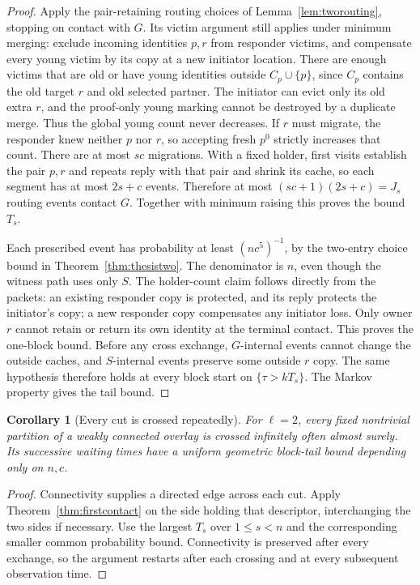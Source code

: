 \documentclass[11pt]{article}
\newtheorem{corollary}[theorem]{Corollary}
\begin{document}
\begin{proof}
Apply the pair-retaining routing choices of
Lemma~\ref{lem:tworouting}, stopping on contact with $G$.
Its victim argument still applies under minimum merging:
exclude incoming identities $p,r$ from responder victims,
and compensate every young victim by its copy at a new
initiator location. There are enough victims that are old
or have young identities outside $C_p\cup\{p\}$, since
$C_p$ contains the old target $r$ and old selected partner.
The initiator can evict only its old extra $r$, and the
proof-only young marking cannot be destroyed by a duplicate
merge. Thus the global young count never decreases.
If $r$ must migrate, the responder knew neither $p$ nor
$r$, so accepting fresh $p^0$ strictly increases that count.
There are at most $sc$ migrations. With a fixed holder,
first visits establish the pair $p,r$ and repeats reply
with that pair and shrink its cache, so each segment
has at most $2s+c$ events. Therefore at most
$(sc+1)(2s+c)=J_s$ routing events contact $G$.
Together with minimum raising this proves the bound $T_s$.

Each prescribed event has probability at least
$(nc^5)^{-1}$, by the two-entry choice bound in
Theorem~\ref{thm:thesistwo}. The denominator
is $n$, even though the witness path uses only $S$.
The holder-count claim follows directly from the packets:
an existing responder copy is protected, and its reply
protects the initiator's copy; a new responder copy
compensates any initiator loss. Only owner $r$ cannot
retain or return its own identity at the terminal contact.
This proves the one-block bound. Before any cross exchange,
$G$-internal events cannot change the outside caches, and
$S$-internal events preserve some outside $r$ copy.
The same hypothesis therefore holds at every block start
on $\{\tau>kT_s\}$. The Markov property gives the tail bound.
\end{proof}

\begin{corollary}[Every cut is crossed repeatedly]
\label{cor:repeatedcontact}
For $\ell=2$, every fixed nontrivial partition of a weakly
connected overlay is crossed infinitely often almost surely.
Its successive waiting times have a uniform geometric
block-tail bound depending only on $n,c$.
\end{corollary}
\begin{proof}
Connectivity supplies a directed edge across each cut.
Apply Theorem~\ref{thm:firstcontact} on the side holding
that descriptor, interchanging the two sides if necessary.
Use the largest $T_s$ over $1\le s<n$ and the corresponding
smaller common probability bound. Connectivity is preserved
after every exchange, so the argument restarts after each
crossing and at every subsequent observation time.
\end{proof}
\end{document}

